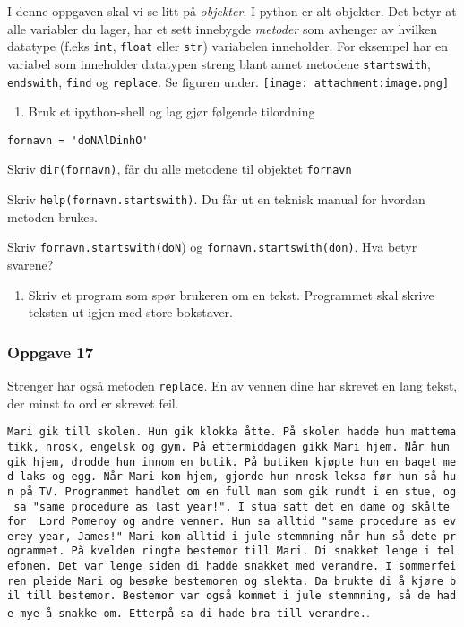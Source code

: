 \documentclass[11pt]{article}
\providecommand{\tightlist}{%
      \setlength{\itemsep}{0pt}\setlength{\parskip}{0pt}}
\begin{document}
I denne oppgaven skal vi se litt på \emph{objekter}. I python er alt
objekter. Det betyr at alle variabler du lager, har et sett innebygde
\emph{metoder} som avhenger av hvilken datatype (f.eks \texttt{int},
\texttt{float} eller \texttt{str}) variabelen inneholder. For eksempel
har en variabel som inneholder datatypen streng blant annet metodene
\texttt{startswith}, \texttt{endswith}, \texttt{find} og
\texttt{replace}. Se figuren under.
\texttt{[image: attachment:image.png]}

\begin{enumerate}
\def\labelenumi{\alph{enumi})}
\tightlist
\item
  Bruk et ipython-shell og lag gjør følgende tilordning
\end{enumerate}

\begin{verbatim}
fornavn = 'doNAlDinhO'
\end{verbatim}

Skriv \texttt{dir(fornavn)}, får du alle metodene til objektet
\texttt{fornavn}

Skriv \texttt{help(fornavn.startswith)}. Du får ut en teknisk manual for
hvordan metoden brukes.

Skriv \texttt{fornavn.startswith(\textquotesingle{}doN}) og
\texttt{fornavn.startswith(\textquotesingle{}don\textquotesingle{})}.
Hva betyr svarene?

\begin{enumerate}
\def\labelenumi{\alph{enumi})}
\setcounter{enumi}{1}
\tightlist
\item
  Skriv et program som spør brukeren om en tekst. Programmet skal skrive
  teksten ut igjen med store bokstaver.
\end{enumerate}

    \hypertarget{oppgave-17}{%
\subsubsection{Oppgave 17}\label{oppgave-17}}

Strenger har også metoden \texttt{replace}. En av vennen dine har
skrevet en lang tekst, der minst to ord er skrevet feil.

\texttt{Mari\ gik\ till\ skolen.\ Hun\ gik\ klokka\ åtte.\ På\ skolen\ hadde\ hun\ mattematikk,\ nrosk,\ engelsk\ og\ gym.\ På\ ettermiddagen\ gikk\ Mari\ hjem.\ Når\ hun\ gik\ hjem,\ drodde\ hun\ innom\ en\ butik.\ På\ butiken\ kjøpte\ hun\ en\ baget\ med\ laks\ og\ egg.\ Når\ Mari\ kom\ hjem,\ gjorde\ hun\ nrosk\ leksa\ før\ hun\ så\ hun\ på\ TV.\ Programmet\ handlet\ om\ en\ full\ man\ som\ gik\ rundt\ i\ en\ stue,\ og\ sa\ "same\ procedure\ as\ last\ year!".\ I\ stua\ satt\ det\ en\ dame\ og\ skålte\ for\ \ Lord\ Pomeroy\ og\ andre\ venner.\ Hun\ sa\ alltid\ "same\ procedure\ as\ everey\ year,\ James!"\ Mari\ kom\ alltid\ i\ jule\ stemmning\ når\ hun\ så\ dete\ programmet.\ På\ kvelden\ ringte\ bestemor\ till\ Mari.\ Di\ snakket\ lenge\ i\ telefonen.\ Det\ var\ lenge\ siden\ di\ hadde\ snakket\ med\ verandre.\ I\ sommerfeiren\ pleide\ Mari\ og\ besøke\ bestemoren\ og\ slekta.\ Da\ brukte\ di\ å\ kjøre\ bil\ till\ bestemor.\ Bestemor\ var\ også\ kommet\ i\ jule\ stemmning,\ så\ de\ hade\ mye\ å\ snakke\ om.\ Etterpå\ sa\ di\ hade\ bra\ till\ verandre.}.
\end{document}

